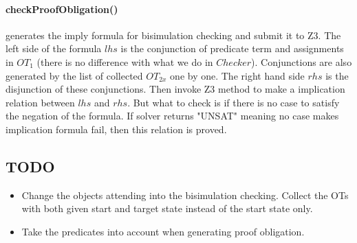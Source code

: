 \documentclass[a4paper]{lncs/llncs}
\begin{document}
\paragraph{checkProofObligation()} generates the imply formula for bisimulation checking and submit it to Z3. The left side of the formula $lhs$ is the conjunction of predicate term and assignments in $OT_1$ (there is no difference with what we do in $Checker$). Conjunctions are also generated by the list of collected $OT_{2x}$ one by one. The right hand side $rhs$ is the disjunction of these conjunctions. Then invoke Z3 method to make a implication relation between $lhs$ and $rhs$.
But what to check is if there is no case to satisfy the negation of the formula. If solver returns "UNSAT" meaning no case makes implication formula fail, then this relation is proved.

\subsection{TODO}
\begin{itemize}	
	\item Change the objects attending into the bisimulation checking. Collect the OTs with both given start and target state instead of the start state only.
	\item Take the predicates into account when generating proof obligation.
\end{itemize}
\end{document}
